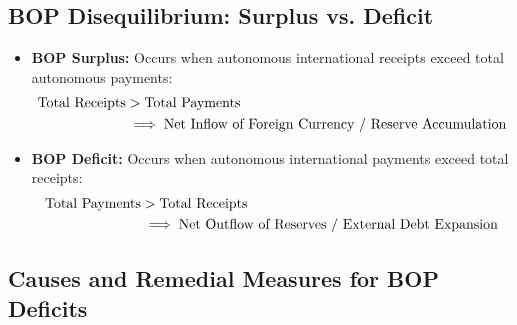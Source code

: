 \subsection{BOP Disequilibrium: Surplus vs. Deficit}
\begin{itemize}[leftmargin=*]
    \item \textbf{BOP Surplus:} Occurs when autonomous international receipts exceed total autonomous payments:
    \begin{align}
        \text{Total Receipts} &> \text{Total Payments} \notag\\
        &\implies \text{Net Inflow of Foreign Currency / Reserve Accumulation}
    \end{align}
    \item \textbf{BOP Deficit:} Occurs when autonomous international payments exceed total receipts:
    \begin{align}
        \text{Total Payments} &> \text{Total Receipts} \notag\\
        &\implies \text{Net Outflow of Reserves / External Debt Expansion}
    \end{align}
\end{itemize}

\subsection{Causes and Remedial Measures for BOP Deficits}

